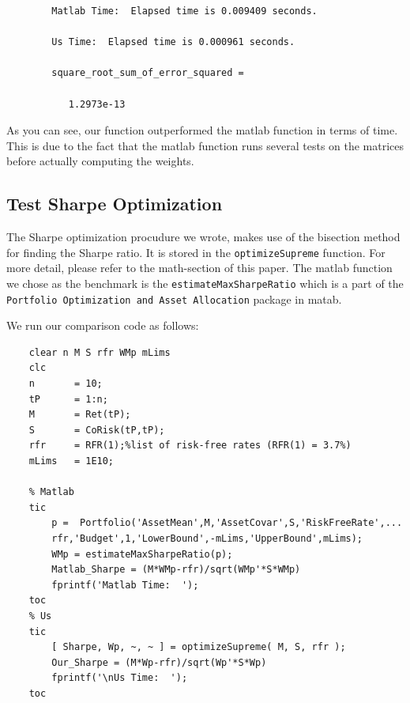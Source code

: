 \documentclass[12pt,titlepage,a4paper]{article}
\begin{document}
    \color{lightgray} \begin{verbatim}
		Matlab Time:  Elapsed time is 0.009409 seconds.

		Us Time:  Elapsed time is 0.000961 seconds.

		square_root_sum_of_error_squared =

		   1.2973e-13

	\end{verbatim} \color{black}
    \begin{par}
		As you can see, our function outperformed the matlab function in terms of time. This is due to the fact that the matlab function runs several tests on the matrices before actually computing the weights.
	\end{par} \vspace{1em}


	\subsection*{Test Sharpe Optimization}

	\begin{par}
	The Sharpe optimization procudure we wrote, makes use of the bisection method for finding the Sharpe ratio. It is stored in the \texttt{optimizeSupreme} function. For more detail, please refer to the math-section of this paper. The matlab function we chose as the benchmark is the \texttt{estimateMaxSharpeRatio} which is a part of the \texttt{Portfolio Optimization and Asset Allocation} package in matab.
	\end{par} \vspace{1em}
	\begin{par}
	We run our comparison code as follows:
	\end{par} \vspace{1em}
	\begin{verbatim}
	clear n M S rfr WMp mLims
	clc
	n       = 10;
	tP      = 1:n;
	M       = Ret(tP);
	S       = CoRisk(tP,tP);
	rfr     = RFR(1);%list of risk-free rates (RFR(1) = 3.7%)
	mLims   = 1E10;

	% Matlab
	tic
	    p =  Portfolio('AssetMean',M,'AssetCovar',S,'RiskFreeRate',...
	    rfr,'Budget',1,'LowerBound',-mLims,'UpperBound',mLims);
	    WMp = estimateMaxSharpeRatio(p);
	    Matlab_Sharpe = (M*WMp-rfr)/sqrt(WMp'*S*WMp)
	    fprintf('Matlab Time:  ');
	toc
	% Us
	tic
	    [ Sharpe, Wp, ~, ~ ] = optimizeSupreme( M, S, rfr );
	    Our_Sharpe = (M*Wp-rfr)/sqrt(Wp'*S*Wp)
	    fprintf('\nUs Time:  ');
	toc
	\end{verbatim}
\end{document}
